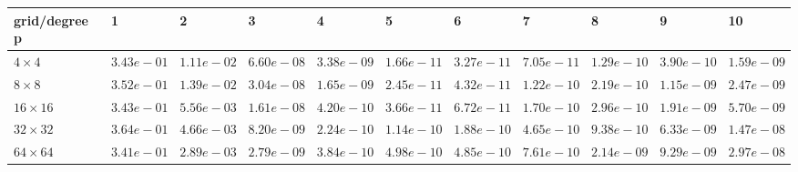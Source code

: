 \begin{tabular}{lllllllllll}
\hline
 grid/degree p   & 1          & 2          & 3          & 4          & 5          & 6          & 7          & 8          & 9          & 10         \\
\hline
 $4 \times 4$    & $3.43e-01$ & $1.11e-02$ & $6.60e-08$ & $3.38e-09$ & $1.66e-11$ & $3.27e-11$ & $7.05e-11$ & $1.29e-10$ & $3.90e-10$ & $1.59e-09$ \\
 $8 \times 8$    & $3.52e-01$ & $1.39e-02$ & $3.04e-08$ & $1.65e-09$ & $2.45e-11$ & $4.32e-11$ & $1.22e-10$ & $2.19e-10$ & $1.15e-09$ & $2.47e-09$ \\
 $16 \times 16$  & $3.43e-01$ & $5.56e-03$ & $1.61e-08$ & $4.20e-10$ & $3.66e-11$ & $6.72e-11$ & $1.70e-10$ & $2.96e-10$ & $1.91e-09$ & $5.70e-09$ \\
 $32 \times 32$  & $3.64e-01$ & $4.66e-03$ & $8.20e-09$ & $2.24e-10$ & $1.14e-10$ & $1.88e-10$ & $4.65e-10$ & $9.38e-10$ & $6.33e-09$ & $1.47e-08$ \\
 $64 \times 64$  & $3.41e-01$ & $2.89e-03$ & $2.79e-09$ & $3.84e-10$ & $4.98e-10$ & $4.85e-10$ & $7.61e-10$ & $2.14e-09$ & $9.29e-09$ & $2.97e-08$ \\
\hline
\end{tabular}